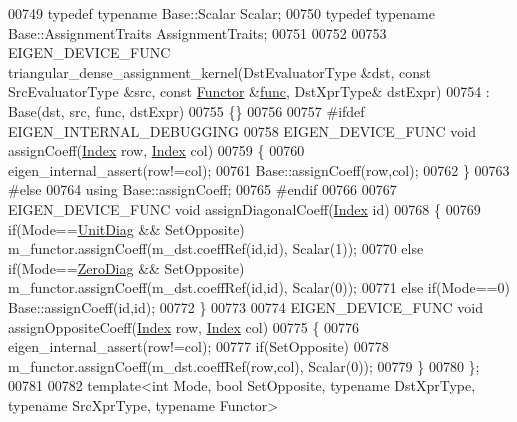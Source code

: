 \begin{DoxyCode}
00749   \textcolor{keyword}{typedef} \textcolor{keyword}{typename} Base::Scalar Scalar;
00750   \textcolor{keyword}{typedef} \textcolor{keyword}{typename} Base::AssignmentTraits AssignmentTraits;
00751   
00752   
00753   EIGEN\_DEVICE\_FUNC triangular\_dense\_assignment\_kernel(DstEvaluatorType &dst, \textcolor{keyword}{const} SrcEvaluatorType &src, \textcolor{keyword}{
      const} \hyperlink{struct_functor}{Functor} &\hyperlink{structfunc}{func}, DstXprType& dstExpr)
00754     : Base(dst, src, func, dstExpr)
00755   \{\}
00756   
00757 \textcolor{preprocessor}{#ifdef EIGEN\_INTERNAL\_DEBUGGING}
00758   EIGEN\_DEVICE\_FUNC \textcolor{keywordtype}{void} assignCoeff(\hyperlink{group___core___module_a554f30542cc2316add4b1ea0a492ff02}{Index} row, \hyperlink{group___core___module_a554f30542cc2316add4b1ea0a492ff02}{Index} col)
00759   \{
00760     eigen\_internal\_assert(row!=col);
00761     Base::assignCoeff(row,col);
00762   \}
00763 \textcolor{preprocessor}{#else}
00764   \textcolor{keyword}{using} Base::assignCoeff;
00765 \textcolor{preprocessor}{#endif}
00766   
00767   EIGEN\_DEVICE\_FUNC \textcolor{keywordtype}{void} assignDiagonalCoeff(\hyperlink{group___core___module_a554f30542cc2316add4b1ea0a492ff02}{Index} \textcolor{keywordtype}{id})
00768   \{
00769          \textcolor{keywordflow}{if}(Mode==\hyperlink{group__enums_gga39e3366ff5554d731e7dc8bb642f83cdaddb72f888ac85d5a1c52333e54f9374b}{UnitDiag} && SetOpposite) m\_functor.assignCoeff(m\_dst.coeffRef(\textcolor{keywordtype}{id},\textcolor{keywordtype}{id}), Scalar(1));
00770     \textcolor{keywordflow}{else} \textcolor{keywordflow}{if}(Mode==\hyperlink{group__enums_gga39e3366ff5554d731e7dc8bb642f83cda884ff7240392e85aa6e4b3c957e36483}{ZeroDiag} && SetOpposite) m\_functor.assignCoeff(m\_dst.coeffRef(\textcolor{keywordtype}{id},\textcolor{keywordtype}{id}), Scalar(0));
00771     \textcolor{keywordflow}{else} \textcolor{keywordflow}{if}(Mode==0)                       Base::assignCoeff(\textcolor{keywordtype}{id},\textcolor{keywordtype}{id});
00772   \}
00773   
00774   EIGEN\_DEVICE\_FUNC \textcolor{keywordtype}{void} assignOppositeCoeff(\hyperlink{group___core___module_a554f30542cc2316add4b1ea0a492ff02}{Index} row, \hyperlink{group___core___module_a554f30542cc2316add4b1ea0a492ff02}{Index} col)
00775   \{ 
00776     eigen\_internal\_assert(row!=col);
00777     \textcolor{keywordflow}{if}(SetOpposite)
00778       m\_functor.assignCoeff(m\_dst.coeffRef(row,col), Scalar(0));
00779   \}
00780 \};
00781 
00782 \textcolor{keyword}{template}<\textcolor{keywordtype}{int} Mode, \textcolor{keywordtype}{bool} SetOpposite, \textcolor{keyword}{typename} DstXprType, \textcolor{keyword}{typename} SrcXprType, \textcolor{keyword}{typename} Functor>

\end{DoxyCode}
